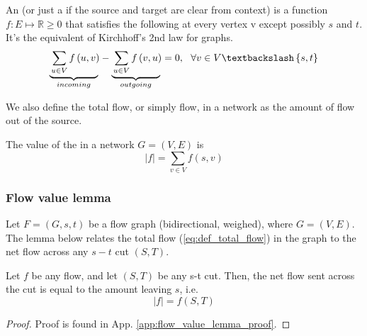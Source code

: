 \documentclass[a4paper]{article}
\begin{document}
\begin{definition}An  (or just a  if the source and target are clear from context) is a function $f:E\mapsto \mathbb{R}\geq 0$ that satisfies the following  at every vertex v except possibly $s$ and $t$. It's the equivalent of Kirchhoff's 2nd law for graphs.
\begin{equation}
    \label{eq:conv_of_flow}
    \myunderbrace{\sum\limits_{u\in V}{f\left( u,v \right)}}{incoming}-
    \myunderbrace{\sum\limits_{u\in V}{f\left( v,u \right)}}{outgoing}=0,\ \ \forall v\in V \textbackslash \left\{ s,t \right\}
\end{equation}
\end{definition}
We also define the total flow, or simply flow, in a network as the amount of flow out of the source.
\begin{definition}
The value of the  in a network $G=(V,E)$ is 
\begin{equation}
    \left| f\right| = \sum\limits_{v\in V}{f\left( s,v \right)}
    \label{eq:def_total_flow}
\end{equation}
\end{definition}


\subsubsection{Flow value lemma}

Let $F = (G, s, t)$ be a flow graph (bidirectional, weighed), where $G=(V,E)$. The lemma below relates the total flow (\eqref{eq:def_total_flow}) in the graph to the net flow across any  $s-t$ cut $(S,T)$.
\begin{lemma}
\label{thm:flow_value}
Let $f$ be any flow, and let $(S,T)$ be any s-t cut. Then, the net flow sent across the cut is equal to the amount leaving $s$, i.e. 
\begin{equation}
    \label{eq:flow_value_lemma}
    \left|f \right| = f(S,T)
\end{equation}
\end{lemma}
\begin{proof}
Proof is found in App. \ref{app:flow_value_lemma_proof}.
\end{proof}
\end{document}

